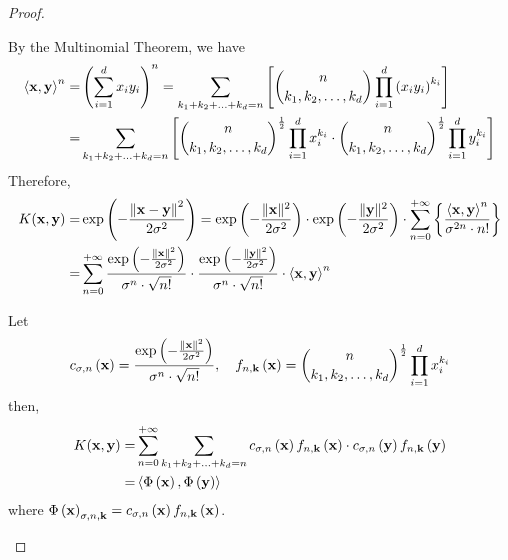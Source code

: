 \begin{proof}
\begin{enumerate}
		      By the Multinomial Theorem, we have
		      \begin{equation*}
			      \begin{aligned}
				      \left\langle{\bf x},\mathbf{y}\right\rangle^{n}= & \left(\sum_{i=1}^{d}x_{i}y_{i}\right)^{n}=\sum_{k_{1}+k_{2}+\ldots+k_{d}=n}\left[\binom{n}{k_{1},k_{2},\ldots,k_{d}}\prod_{i=1}^{d}\left(x_{i}y_{i}\right)^{k_{i}}\right]                                     \\
				      =                                             & \sum_{k_{1}+k_{2}+\ldots+k_{d}=n}\left[\binom{n}{k_{1},k_{2},\ldots,k_{d}}^{\frac{1}{2}}\prod_{i=1}^{d}x_{i}^{k_{i}}\cdot\binom{n}{k_{1},k_{2},\ldots,k_{d}}^{\frac{1}{2}}\prod_{i=1}^{d}y_{i}^{k_{i}}\right] \\
			      \end{aligned}
		      \end{equation*}
		      Therefore,
		      \begin{equation*}
			      \begin{aligned}
				      K({\bf x},\mathbf{y})= & \exp\left(-\frac{\left\|{\bf x}-\mathbf{y}\right\|^{2}}{2\sigma^{2}}\right)=\exp\left(-\frac{\|{\bf x}\|^{2}}{2\sigma^{2}}\right)\cdot\exp\left(-\frac{\|\mathbf{y}\|^{2}}{2\sigma^{2}}\right)\cdot\sum_{n=0}^{+\infty}\left\{\frac{\left\langle{\bf x},\mathbf{y}\right\rangle^{n}}{\sigma^{2n}\cdot n!}\right\} \\
				      =                   & \sum_{n=0}^{+\infty}\frac{\exp\left(-\frac{\|{\bf x}\|^{2}}{2\sigma^{2}}\right)}{\sigma^{n}\cdot\sqrt{n!}}\cdot\frac{\exp\left(-\frac{\|\mathbf{y}\|^{2}}{2\sigma^{2}}\right)}{\sigma^{n}\cdot\sqrt{n!}}\cdot\left\langle{\bf x},\mathbf{y}\right\rangle^{n}
			      \end{aligned}
		      \end{equation*}

		      Let
		      \begin{equation*}
			      c_{\sigma,n}\left({\bf x}\right)=\frac{\exp\left(-\frac{\|{\bf x}\|^{2}}{2\sigma^{2}}\right)}{\sigma^{n}\cdot\sqrt{n!}},\quad f_{n,\mathbf{k}}\left({\bf x}\right)=\binom{n}{k_{1},k_{2},\ldots,k_{d}}^{\frac{1}{2}}\prod_{i=1}^{d}x_{i}^{k_{i}}
		      \end{equation*}
		      then,
		      \begin{equation*}
			      \begin{aligned}
				      K({\bf x},\mathbf{y})= & \sum_{n=0}^{+\infty}\sum_{k_{1}+k_{2}+\ldots+k_{d}=n}c_{\sigma,n}\left({\bf x}\right)f_{n,\mathbf{k}}\left({\bf x}\right)\cdot c_{\sigma,n}\left(\mathbf{y}\right)f_{n,\mathbf{k}}\left(\mathbf{y}\right) \\
				      =                   & \left\langle\Phi\left({\bf x}\right),\Phi\left(\mathbf{y}\right)\right\rangle                                                                                                                          \\
			      \end{aligned}
		      \end{equation*}
		      where $\Phi\left({\bf x}\right)_{\sigma,n,\mathbf{k}}=c_{\sigma,n}\left({\bf x}\right)f_{n,\mathbf{k}}\left({\bf x}\right)$.


\end{enumerate}
\end{proof}
